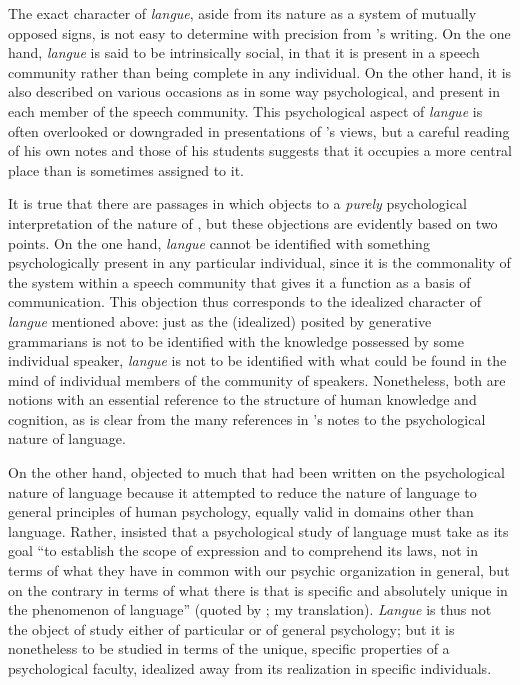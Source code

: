 The exact character of \emph{langue}, aside from its nature as a
system of mutually opposed signs, is not easy to determine with
precision from {\Saussure}'s writing.  On the one hand, \emph{langue}
is said to be intrinsically social, in that it is present in a speech
community rather than being complete in any individual. On the other
hand, it is also described on various occasions as in some way
psychological, and present in each member of the speech community.
This psychological aspect of \emph{langue} is often overlooked or
downgraded in presentations of {\Saussure}'s views, but a careful reading
of his own notes and those of his students suggests that it occupies a
more central place than is sometimes assigned to it.

It is true that there are passages in which {\Saussure} objects to a
\emph{purely} psychological interpretation of the nature of
\emph{}, but these objections are evidently based on two
points.  On the one hand, \emph{langue} cannot be identified with
something psychologically present in any particular individual, since
it is the commonality of the system within a speech community that
gives it a function as a basis of communication.  This objection thus
corresponds to the idealized character of \emph{langue} mentioned
above: just as the (idealized)  posited by generative
grammarians is not to be identified with the knowledge possessed by
some individual speaker, \emph{langue} is not to be identified
with what could be found in the mind of individual members of the
community of speakers.  Nonetheless, both are notions with an
essential reference to the structure of human knowledge and cognition,
as is clear from the many references in {\Saussure}'s notes to the
psychological nature of language.

On the other hand, {\Saussure} objected to much that had been written on
the psychological nature of language because it attempted to reduce
the nature of language to general principles of human psychology,
equally valid in domains other than language.  Rather, {\Saussure}
insisted that a psychological study of language must take as its goal
``to establish the scope of expression and to comprehend its laws, not
in terms of what they have in common with our psychic organization in
general, but on the contrary in terms of what there is that is
specific and absolutely unique in the phenomenon of language'' (quoted
by \citealt[52]{godel57:sources}; my translation).  \emph{Langue} is thus not the
object of study either of particular or of general psychology; but it
is nonetheless to be studied in terms of the unique, specific
properties of a psychological faculty, idealized away from its
realization in specific individuals.

